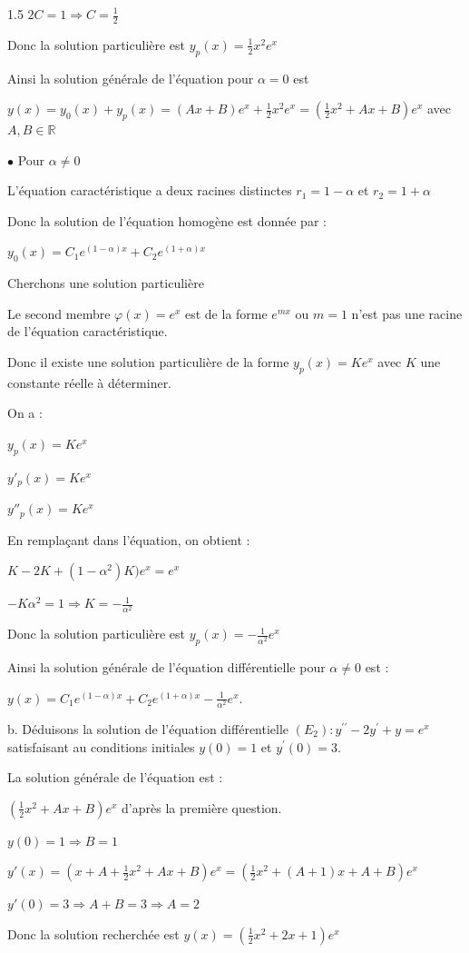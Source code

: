 \documentclass[12pt]{article}
\begin{document}
\begin{spacing}{1.5}
$2C=1\Rightarrow C=\frac{1}{2}$

Donc la solution particulière est $y_p(x)=\frac{1}{2}x^2e^x$

Ainsi la solution générale de l'équation pour $\alpha=0$ est  

$y(x)=y_0(x)+y_p(x)=(Ax+B)e^x+ \frac{1}{2}x^2e^x=(\frac{1}{2}x^2+Ax+B)e^x$ avec $A,B\in \mathbb{R}$

\medskip
$\bullet$ Pour $\alpha\neq 0$

L'équation caractéristique a deux racines distinctes $r_1=1-\alpha$ et $r_2=1+\alpha$

Donc la solution de l'équation homogène est donnée par :

$y_0(x)=C_1e^{(1-\alpha)x}+C_2e^{(1+\alpha)x}$

\medskip
Cherchons une solution particulière

Le second membre $\varphi (x)=e^x$ est de la forme $e^{mx}$ ou $m=1$ n'est pas une racine de l'équation caractéristique.

Donc il existe une solution particulière de la forme $y_p(x)=Ke^x$ avec $K$ une constante réelle à déterminer.

On a :

$y_p(x)=Ke^x$

$y'_p(x)=Ke^x$

$y''_p(x)=Ke^x$

En remplaçant dans l'équation, on obtient :

$K-2K+(1-\alpha^2)K)e^x=e^x$

$-K\alpha^2=1\Longrightarrow K=-\frac{1}{\alpha^2}$

Donc la solution particulière est $y_p(x)=-\frac{1}{\alpha^2}e^x$

Ainsi la solution générale de l'équation différentielle pour $\alpha\neq 0$ est :

$y(x)=C_1e^{(1-\alpha)x}+C_2e^{(1+\alpha)x}-\frac{1}{\alpha^2}e^x$.

b. Déduisons la solution de l'équation différentielle $(E_2):y^{\prime\prime} -2y^{\prime}+y=e^x$ satisfaisant au conditions initiales $y(0)=1$ et $y^\prime(0)=3$.


La solution générale de l'équation est :

$(\frac{1}{2}x^2+Ax+B)e^x$ d'après la première question.

$y(0)=1\Rightarrow B=1$

$y'(x)=(x+A+\frac{1}{2}x^2+Ax+B)e^x=(\frac{1}{2}x^2+(A+1)x+A+B)e^x$

$y'(0)=3\Longrightarrow A+B=3\Longrightarrow A=2$

Donc la solution recherchée est $y(x)=(\frac{1}{2}x^2+2x+1)e^x$

\medskip

\end{spacing}
\end{document}
